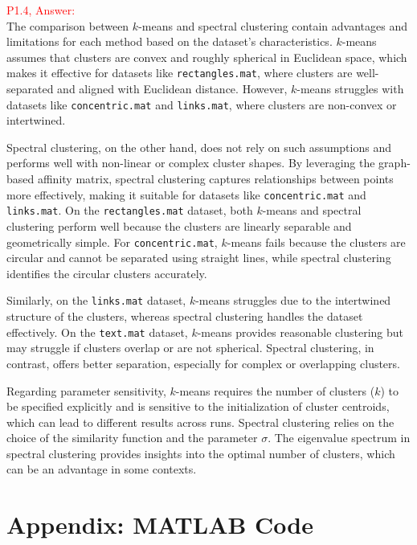 \documentclass[11pt]{article}
\begin{document}
\textcolor{red}{P1.4, Answer:}\\

The comparison between \( k \)-means and spectral clustering contain advantages and limitations for each method based on the dataset's characteristics. 
\( k \)-means assumes that clusters are convex and roughly spherical in Euclidean space, which makes it effective for datasets like \texttt{rectangles.mat}, 
where clusters are well-separated and aligned with Euclidean distance. However, \( k \)-means struggles with datasets like \texttt{concentric.mat} and \texttt{links.mat},
where clusters are non-convex or intertwined.

Spectral clustering, on the other hand, does not rely on such assumptions and performs well with non-linear or complex cluster shapes. 
By leveraging the graph-based affinity matrix, spectral clustering captures relationships between points more effectively, making it suitable for datasets like \texttt{concentric.mat} and \texttt{links.mat}.
On the \texttt{rectangles.mat} dataset, both \( k \)-means and spectral clustering perform well because the clusters are linearly separable and geometrically simple. For \texttt{concentric.mat}, 
\( k \)-means fails because the clusters are circular and cannot be separated using straight lines, while spectral clustering identifies the circular clusters accurately. 

Similarly, on the \texttt{links.mat} dataset, \( k \)-means struggles due to the intertwined structure of the clusters, whereas spectral clustering handles the dataset effectively. On the \texttt{text.mat} dataset, 
\( k \)-means provides reasonable clustering but may struggle if clusters overlap or are not spherical. Spectral clustering, in contrast, offers better separation, especially for complex or overlapping clusters.

Regarding parameter sensitivity, \( k \)-means requires the number of clusters (\( k \)) to be specified explicitly and is sensitive to the initialization of cluster centroids, 
which can lead to different results across runs. Spectral clustering relies on the choice of the similarity function and the parameter \(\sigma\). The eigenvalue spectrum in spectral clustering provides 
insights into the optimal number of clusters, which can be an advantage in some contexts. 


\clearpage

\appendix

\section{Appendix: MATLAB Code}
\end{document}
